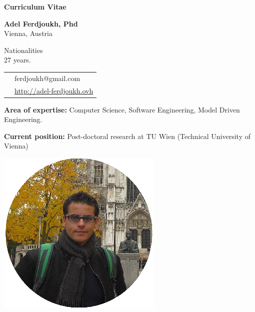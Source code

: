 \thispagestyle{empty}

\renewcommand\refname{~}

\begin{center}
\par\textbf{\huge Curriculum Vitae}
\end{center}

\vspace{.5cm}

\begin{minipage}{0.45\textwidth}
\textbf{Adel Ferdjoukh, Phd} \\
Vienna, Austria

\vspace{.3cm}

Nationalities \fr{} \dz{} \kab{} \\
27 years.

\vspace{.3cm}

\begin{tabular}{cl}
\email{} & ferdjoukh@gmail.com\\

\web{} & \url{http://adel-ferdjoukh.ovh}\\
\end{tabular}

\vspace{.3cm}
{\bf Area of expertise:} Computer Science, Software Engineering, Model Driven Engineering. 

\medskip
{\bf Current position:} Post-doctoral research at TU Wien (Technical University of Vienna)
\end{minipage}
\hfill
\begin{minipage}{0.45\textwidth}
\begin{flushright}
\includegraphics[scale=0.25]{img/me2.png}~~~~~~~~
\end{flushright}
\end{minipage}

\tair

\sectionline{}